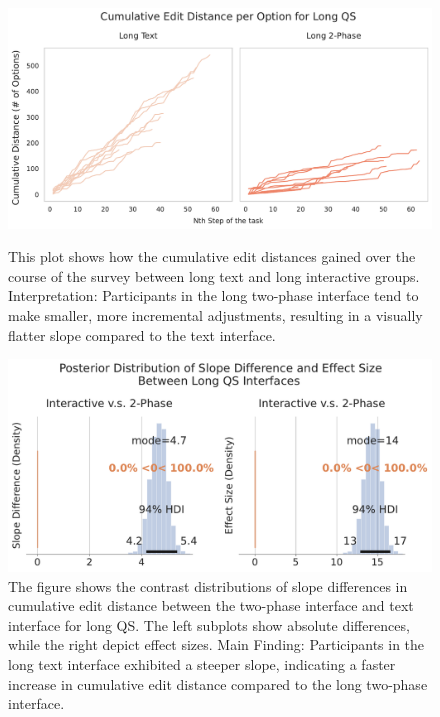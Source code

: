 \begin{figure}[h]
    \centering
    \begin{minipage}[t]{0.48\textwidth}
        \centering
        \includegraphics[width=\textwidth]{content/image/distance/cumulative_edit_distance_per_option_long_qs_v3v4.pdf}
        \caption{This plot shows how the cumulative edit distances gained over the course of the survey between long text and long interactive groups. Interpretation: Participants in the long two-phase interface tend to make smaller, more incremental adjustments, resulting in a visually flatter slope compared to the text interface.}
        \label{fig:cumulative-distance}
    \end{minipage}
    \hfill
    \begin{minipage}[t]{0.48\textwidth}
        \centering
        \includegraphics[width=\textwidth]{content/image/distance/slope_diff_and_effect_size.pdf}
        \caption{The figure shows the contrast distributions of slope differences in cumulative edit distance between the two-phase interface and text interface for long QS. The left subplots show absolute differences, while the right depict effect sizes. Main Finding: Participants in the long text interface exhibited a steeper slope, indicating a faster increase in cumulative edit distance compared to the long two-phase interface.}
        \label{fig:slope-diff-effect}
    \end{minipage}
\end{figure}


